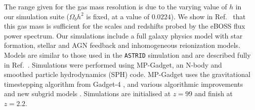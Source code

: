 \documentclass[a4paper,11pt]{article}
\newcommand{\lya}{Lyman-$\alpha$\ }
\begin{document}
The range given for the gas mass resolution is due to the varying value of $h$ in our simulation suite ($\Omega_b h^2$ is fixed, at a value of $0.0224$). We show in Ref.~\cite{2023simsuite} that this gas mass is sufficient for the scales and redshifts probed by the eBOSS flux power spectrum. Our simulations include a full galaxy physics model with star formation, stellar and AGN feedback and inhomogeneous reionization models. Models are similar to those used in the \texttt{ASTRID} simulation \cite{2022MNRAS.512.3703B, 2022MNRAS.513..670N} and are described fully in Ref.~\cite{2023simsuite}.
Simulations were performed using MP-Gadget\footnotemark, an N-body and smoothed particle hydrodynamics (SPH) code.
MP-Gadget uses the gravitational timestepping algorithm from Gadget-4 \cite{Springel:2021}, and various algorithmic improvements and new subgrid models \cite{2022MNRAS.512.3703B,2022MNRAS.513..670N,2020JCAP...06..002B}.
Simulations are initialised at $z=99$ and finish at $z=2.2$.


\end{document}
